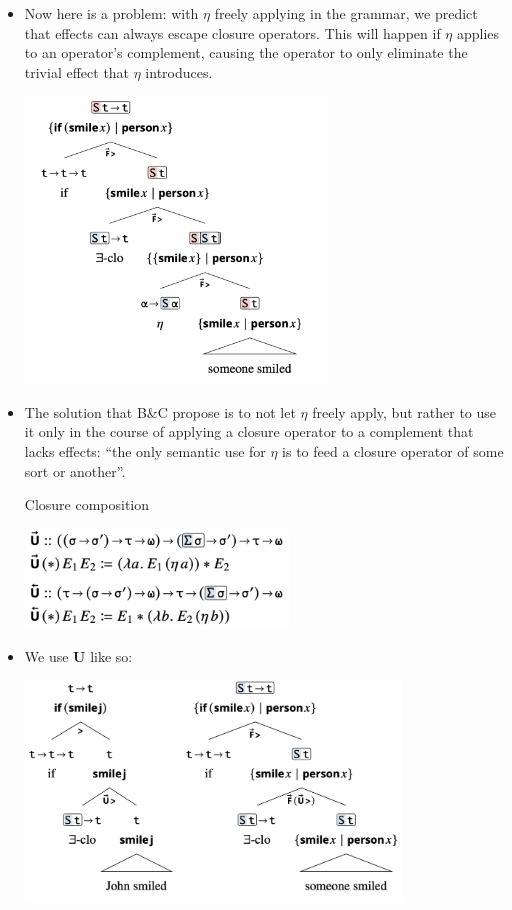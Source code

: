 \documentclass{article}
\begin{document}
\begin{itemize}
\begin{exe}
\begin{center}
      \end{center}
    \end{exe}
  \item Now here is a problem: with $\eta$ freely applying in the grammar, we predict that effects can always escape closure operators.
    This will happen if $\eta$ applies to an operator's complement, causing the operator to only eliminate the trivial effect that $\eta$ introduces.
    \begin{exe}
      \ex \hfill \begin{center}
        \includegraphics[width=8cm]{clips/40.png}
      \end{center}
    \end{exe}
  \item The solution that B\&C propose is to not let $\eta$ freely apply, but rather to use it only in the course of applying a closure
    operator to a complement that lacks effects: ``the only semantic use for $\eta$ is to feed a closure operator of some sort or another''.
    \begin{exe}
      \ex Closure composition \hfill \begin{center}
        \includegraphics[width=7cm]{clips/41.png}
      \end{center}
    \end{exe}
  \item We use \textbf{U} like so:
    \begin{exe}
      \ex \hfill \begin{center}
        \includegraphics[width=10cm]{clips/42.png}

\end{center}
\end{exe}
\end{itemize}
\end{document}
